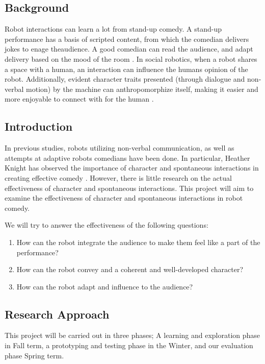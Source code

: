 \documentclass[onecolumn, draftclsnofoot,10pt, compsoc]{IEEEtran}
\begin{document}
\subsection{Background}
Robot interactions can learn a lot from stand-up comedy. A stand-up performance has a basis of scripted content, from which the comedian delivers jokes to enage theaudience. A good comedian can read the audience, and adapt delivery based on the mood of the room \cite{talkingFunny}. In social robotics, when a robot shares a space with a human, an interaction can influence the humans opinion of the robot. Additionally, evident character traits presented (through dialogue and non-verbal motion) by the machine can anthropomorphize itself, making it easier and more enjoyable to connect with for the human \cite{KnightEightLessons:2011}.



\subsection{Introduction}
In previous studies, robots utilizing non-verbal communication, as well as attempts at adaptive robots comedians have been done. In particular, Heather Knight has observed the importance of character and spontaneous interactions in creating effective comedy \cite{KnightEightLessons:2011}. However, there is little research on the actual effectiveness of character and spontaneous interactions. This project will aim to examine the effectiveness of character and spontaneous interactions in robot comedy.

We will try to answer the effectiveness of the following questions:
\begin{enumerate}[\IEEEsetlabelwidth{6)}]
\item How can the robot integrate the audience to make them feel like a part of the performance?
\item How can the robot convey and a coherent and well-developed character?
\item How can the robot adapt and influence to the audience?
\end{enumerate}


\subsection{Research Approach}
This project will be carried out in three phases; A learning and exploration phase in Fall term, a prototyping and testing phase in the Winter, and our evaluation phase Spring term.
\end{document}
